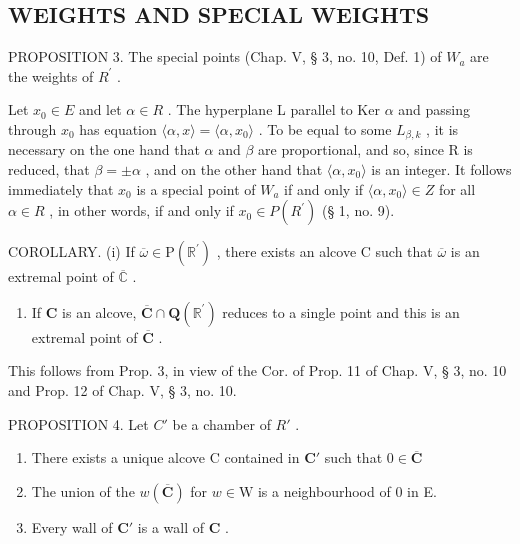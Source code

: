 \subsection{WEIGHTS AND SPECIAL WEIGHTS}

PROPOSITION 3. The special points (Chap. V, § 3, no. 10, Def. 1) of \(W_{a}\) are the weights of \(R^{\prime}\) .

Let \(x_0 \in E\) and let \(\alpha \in R\) . The hyperplane L parallel to Ker \(\alpha\) and passing through \(x_0\) has equation \(\langle \alpha, x \rangle = \langle \alpha, x_0 \rangle\) . To be equal to some \(L_{\beta,k}\) , it is necessary on the one hand that \(\alpha\) and \(\beta\) are proportional, and so, since R is reduced, that \(\beta = \pm \alpha\) , and on the other hand that \(\langle \alpha, x_0 \rangle\) is an integer. It follows immediately that \(x_0\) is a special point of \(W_a\) if and only if \(\langle \alpha, x_0 \rangle \in Z\) for all \(\alpha \in R\) , in other words, if and only if \(x_0 \in P(R^{\prime})\) (§ 1, no. 9).

COROLLARY. (i) If \(\overline{\omega} \in \mathrm{P}(\mathbb{R}^{\prime})\) , there exists an alcove C such that \(\overline{\omega}\) is an extremal point of \(\overline{\mathbb{C}}\) .

\begin{enumerate}
\def\labelenumi{(\roman{enumi})}
\setcounter{enumi}{1}
\tightlist
\item
  If \(\mathbf{C}\) is an alcove, \(\overline{\mathbf{C}} \cap \mathbf{Q}(\mathbb{R}^{\prime})\) reduces to a single point and this is an extremal point of \(\overline{\mathbf{C}}\) .
\end{enumerate}

This follows from Prop. 3, in view of the Cor. of Prop. 11 of Chap. V, § 3, no. 10 and Prop. 12 of Chap. V, § 3, no. 10.

PROPOSITION 4. Let \(C'\) be a chamber of \(R'\) .

\begin{enumerate}
\def\labelenumi{(\roman{enumi})}
\item
  There exists a unique alcove C contained in \(\mathbf{C}'\) such that \(0\in \overline{\mathbf{C}}\)
\item
  The union of the \(w(\overline{\mathbf{C}})\) for \(w\in \mathrm{W}\) is a neighbourhood of 0 in E.
\item
  Every wall of \(\mathbf{C}'\) is a wall of \(\mathbf{C}\) .
\end{enumerate}


